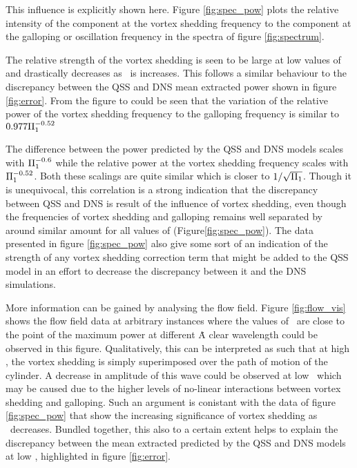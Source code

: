 This influence is explicitly shown here. Figure \ref{fig:spec_pow} plots the relative intensity of the component at the vortex shedding frequency to the component at the galloping or oscillation frequency in the spectra of figure \ref{fig:spectrum}.



The relative strength of the vortex shedding is seen to be large at low values of \massstiff and drastically decreases as \massstiff\ is increases. This follows a similar behaviour to the discrepancy between the QSS and DNS mean extracted power shown in figure \ref{fig:error}. From the figure to could be seen that the variation of the relative power of the vortex shedding frequency to the galloping frequency is similar to  $0.977\Pi_1^{-0.52}$ 

The difference between the power predicted by the QSS and DNS models scales with $\Pi_1^{-0.6}$ while the relative power at the vortex shedding frequency scales with $\Pi_1^{-0.52}$. Both these scalings are quite similar which is closer to $1/\sqrt{\Pi_1}$. Though it is unequivocal, this correlation is a strong indication that the discrepancy between QSS and DNS is result of the influence of vortex shedding, even though the frequencies of vortex shedding and galloping remains well separated by around similar amount for all values of \massstiff (Figure\ref{fig:spec_pow}). The data presented in figure \ref{fig:spec_pow} also give some sort of an indication of the strength of any vortex shedding correction term that might be added to the QSS model in an effort to decrease the discrepancy between it and the DNS simulations.





More information can be gained by analysing the flow field. Figure \ref{fig:flow_vis} shows the flow field data at arbitrary instances where the values of \massdamp\ are close to the point of the maximum power at different \massstiff\. A clear wavelength could be observed in this figure. Qualitatively, this can be interpreted as such that at high \massstiff, the vortex shedding is simply superimposed over the path of motion of the cylinder. A decrease in amplitude of this wave could be observed at low \massstiff\ which may be caused due to the higher levels of no-linear interactions between vortex shedding and galloping. Such an argument is conistant with the data of figure \ref{fig:spec_pow} that show the increasing significance of vortex shedding as \massstiff\ decreases. Bundled together, this also to a certain extent helps to explain the discrepancy between the mean extracted predicted by the QSS and DNS models at low \massstiff, highlighted in figure \ref{fig:error}.


